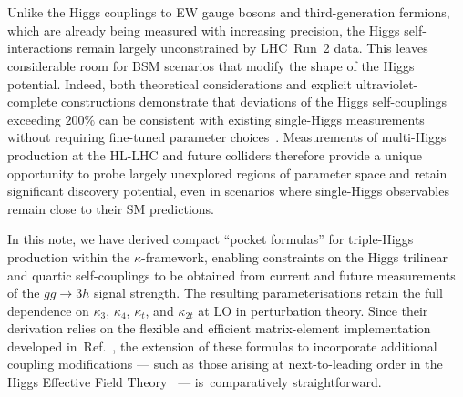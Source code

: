 \documentclass{SciPost}
\begin{document}
\section{\textbf{}}
\label{sec:conclusions}

Unlike the Higgs couplings to EW gauge bosons and third-generation fermions, which are already being measured with increasing precision, the Higgs self-interactions remain largely unconstrained by LHC~Run~2 data. This leaves considerable room for BSM scenarios that modify the shape of the Higgs potential. Indeed, both theoretical considerations and explicit ultraviolet-complete constructions demonstrate that deviations of the Higgs self-couplings exceeding $200\%$ can be consistent with existing single-Higgs measurements without requiring fine-tuned parameter choices~\cite{Durieux:2022hbu}. Measurements of multi-Higgs production at the HL-LHC and future colliders therefore provide a unique opportunity to probe largely unexplored regions of parameter space and retain significant discovery potential, even in scenarios where single-Higgs observables remain close to their SM predictions.

In this note, we have derived compact ``pocket formulas'' for triple-Higgs production within the $\kappa$-framework, enabling constraints on the Higgs trilinear and quartic self-couplings to be obtained from current and future measurements of the $gg \to 3h$ signal strength. The resulting parameterisations retain the full dependence on $\kappa_3$, $\kappa_4$, $\kappa_t$, and $\kappa_{2t}$ at LO in perturbation theory. Since their derivation relies on the flexible and efficient matrix-element implementation developed in~Ref.~\cite{Campbell:2025llb}, the extension of these formulas to incorporate additional coupling modifications --- such as those arising at next-to-leading order in the Higgs Effective Field Theory~\cite{Brivio:2025sib} --- is~comparatively straightforward.
\end{document}
